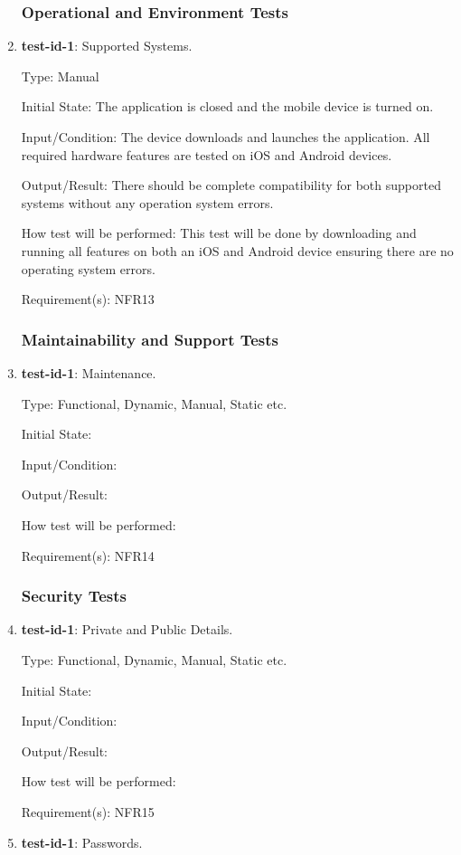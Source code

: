 \documentclass[12pt, titlepage]{article}
\begin{document}
\begin{enumerate}
	\subsubsection{Operational and Environment Tests}
		\item{\textbf{test-id-1}}: Supported Systems.
		
		Type: Manual
		
		Initial State: The application is closed and the mobile device is turned on.
		
		Input/Condition: The device downloads and launches the application. All required hardware features are tested on iOS and Android devices.
		
		Output/Result: There should be complete compatibility for both supported systems without any operation system errors. 
		
		How test will be performed: This test will be done by downloading and running all features on both an iOS and Android device ensuring there are no operating system errors.
		
		Requirement(s): NFR13
	\subsubsection{Maintainability and Support Tests}
		\item{\textbf{test-id-1}}: Maintenance.
		
		Type: Functional, Dynamic, Manual, Static etc.
		
		Initial State: 
		
		Input/Condition: 
		
		Output/Result: 
		
		How test will be performed: 
		
		Requirement(s): NFR14
	\subsubsection{Security Tests}
		\item{\textbf{test-id-1}}: Private and Public Details.
		
		Type: Functional, Dynamic, Manual, Static etc.
		
		Initial State: 
		
		Input/Condition: 
		
		Output/Result: 
		
		How test will be performed: 
		
		Requirement(s): NFR15
		
		\item{\textbf{test-id-1}}: Passwords.
		

\end{enumerate}
\end{document}

